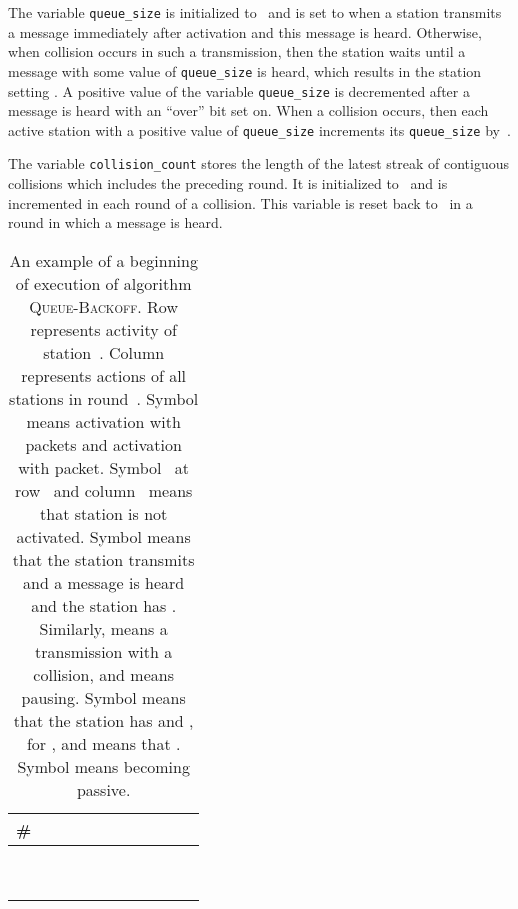 \documentclass[11pt]{article}
\newlength{\pagewidth}
\newcommand{\RB}{\raisebox{2.5ex}{~}}
\newcommand{\LB}{\raisebox{-1.5ex}{~}}
\begin{document}
The variable \texttt{queue\_size} is initialized to~ and is set to  when a station transmits a message immediately after activation and this message is heard.
Otherwise, when collision occurs in such a transmission, then the station waits until a message with some value  of \texttt{queue\_size} is heard, which results in the station setting .
A positive value of the variable \texttt{queue\_size} is decremented after a message  is heard with an ``over'' bit set on.
When a collision occurs, then each active station with a positive value of \texttt{queue\_size} increments its \texttt{queue\_size} by~. 

The variable \texttt{collision\_count} stores the length of the latest streak of contiguous collisions which includes the preceding round.
It is initialized to~ and is incremented in each round of a collision.
This variable is reset back to~ in a round in which a message is heard.





\begin{table}[t]
\begin{center}
\begin{tabular}{| c ||c |c |c |c |c | c | c | c | c | c | }
\hline
\RB \LB
\# &  &  &  &&&  & & &  &  \\
\hline\hline
\RB \LB
&   &  &  &  & &  &  & & &  \\
&  &  &  &  & &  &  & & &  \\
\hline
\RB \LB
 & &  &   &  &  & &  & &&\\
& & &   &  &  & &  &&&\\
\hline
\RB \LB
 & & &   &  &  &  &&& &\\
& & & &  &  &   &&& &\\
\hline\RB \LB
 & & &  &   & &&&& &\\
\hline
\RB \LB
 & & && &  & & && &\\
 & & && & & &&& &\\
\hline
\end{tabular}
\parbox{\pagewidth}{
~
\caption{\label{tab:example-queue-backoff}
An example of a beginning of execution of algorithm \textsc{Queue-Backoff}.
Row  represents activity of station~.
Column  represents actions of all stations in round~.
Symbol  means activation with  packets and  activation with  packet.
Symbol~ at row~  and column~ means that station  is not activated.
Symbol   means that the station transmits and a message is heard and the station has .
Similarly,  means a transmission with a collision, and  means pausing.
Symbol  means that the station has  and , for , and  means that .
Symbol  means becoming passive.
}}
\end{center}
\end{table}
\end{document}
